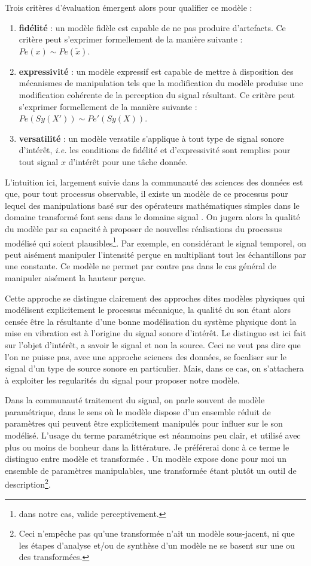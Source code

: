 Trois critères d'évaluation émergent alors pour qualifier ce modèle :
\begin{enumerate}
  \item \textbf{fidélité} : un modèle fidèle est capable de ne pas produire d'artefacts. Ce critère peut s'exprimer formellement de la manière suivante : $Pe(x) \sim Pe(\tilde{x})$.
  \item \textbf{expressivité} : un modèle expressif est capable de mettre à disposition des mécanismes de manipulation tels que la modification du modèle produise une modification cohérente de la perception du signal résultant. Ce critère peut s'exprimer formellement de la manière suivante : $Pe(Sy(X')) \sim Pe'(Sy(X))$.
  \item \textbf{versatilité} : un modèle versatile s'applique à tout type de signal sonore d'intérêt, \textit{i.e.} les conditions de fidélité et d'expressivité sont remplies pour tout signal $x$ d'intérêt pour une tâche donnée.
\end{enumerate}

L'intuition ici, largement suivie dans la communauté des sciences des données est que, pour tout processus observable, il existe un modèle de ce processus pour lequel des manipulations basé sur des opérateurs mathématiques simples dans le domaine transformé \og font sens \fg dans le domaine \fg signal \og. On jugera alors la qualité du modèle par sa capacité à proposer de nouvelles réalisations du processus modélisé qui soient plausibles\footnote{dans notre cas, valide perceptivement.}. Par exemple, en considérant le signal temporel, on peut aisément manipuler l'intensité perçue en multipliant tout les échantillons par une constante. Ce modèle ne permet par contre pas dans le cas général de manipuler aisément la hauteur perçue.

Cette approche se distingue clairement des approches dites \og modèles physiques \fg qui modélisent explicitement le processus mécanique, la qualité du son étant alors censée être la résultante d'une bonne modélisation du système physique dont la mise en vibration est à l'origine du signal sonore d'intérêt. Le distinguo est ici fait sur l'objet d'intérêt, a savoir le signal et non la source. Ceci ne veut pas dire que l'on ne puisse pas, avec une approche sciences des données, se focaliser sur le signal d'un type de source sonore en particulier. Mais, dans ce cas, on s'attachera à exploiter les regularités du signal pour proposer notre modèle.

Dans la communauté traitement du signal, on parle souvent de modèle paramétrique, dans le sens où le modèle dispose d'un ensemble réduit de paramètres qui peuvent être explicitement manipulés pour influer sur le son modélisé. L'usage du terme \og paramétrique \fg est néanmoins peu clair, et utilisé avec plus ou moins de bonheur dans la littérature. Je préférerai donc à ce terme le distinguo entre \og modèle \fg et \og transformée \fg. Un modèle expose donc pour moi un ensemble de paramètres manipulables, une transformée étant plutôt un outil de description\footnote{Ceci n'empêche pas qu'une transformée n'ait un modèle sous-jacent, ni que les étapes d'analyse et/ou de synthèse d'un modèle ne se basent sur une ou des transformées.}.

